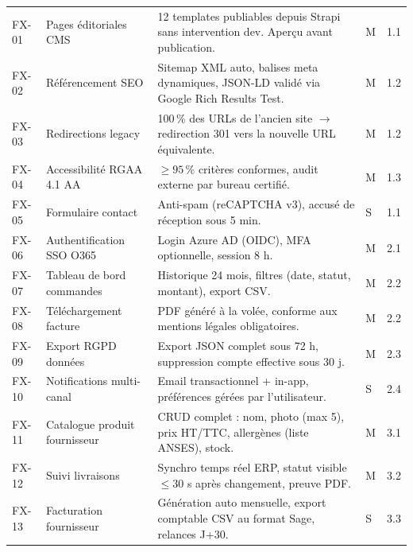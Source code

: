 \documentclass[11pt,a4paper,oneside]{report}
\begin{document}
\renewcommand{\arraystretch}{1.3}
\begin{tabularx}{\textwidth}{C{1.1cm} L{3.5cm} Y C{1cm} C{1cm}}
\toprule
{} &  &  &  &  \\
\midrule
FX-01 & Pages éditoriales CMS         & 12 templates publiables depuis Strapi sans intervention dev. Aperçu avant publication. & M & 1.1 \\
FX-02 & Référencement SEO             & Sitemap XML auto, balises meta dynamiques, JSON-LD validé via Google Rich Results Test. & M & 1.2 \\
FX-03 & Redirections legacy           & 100\,\% des URLs de l'ancien site $\to$ redirection 301 vers la nouvelle URL équivalente. & M & 1.2 \\
FX-04 & Accessibilité RGAA 4.1 AA     & $\geq 95\,\%$ critères conformes, audit externe par bureau certifié. & M & 1.3 \\
FX-05 & Formulaire contact            & Anti-spam (reCAPTCHA v3), accusé de réception sous 5 min. & S & 1.1 \\
\midrule
{}
FX-06 & Authentification SSO O365     & Login Azure AD (OIDC), MFA optionnelle, session 8 h. & M & 2.1 \\
FX-07 & Tableau de bord commandes     & Historique 24 mois, filtres (date, statut, montant), export CSV. & M & 2.2 \\
FX-08 & Téléchargement facture        & PDF généré à la volée, conforme aux mentions légales obligatoires. & M & 2.2 \\
FX-09 & Export RGPD données           & Export JSON complet sous 72 h, suppression compte effective sous 30 j. & M & 2.3 \\
FX-10 & Notifications multi-canal     & Email transactionnel + in-app, préférences gérées par l'utilisateur. & S & 2.4 \\
\midrule
FX-11 & Catalogue produit fournisseur & CRUD complet : nom, photo (max 5), prix HT/TTC, allergènes (liste ANSES), stock. & M & 3.1 \\
FX-12 & Suivi livraisons              & Synchro temps réel ERP, statut visible $\leq 30$ s après changement, preuve PDF. & M & 3.2 \\
FX-13 & Facturation fournisseur       & Génération auto mensuelle, export comptable CSV au format Sage, relances J+30. & S & 3.3 \\
\midrule

\end{tabularx}
\end{document}
